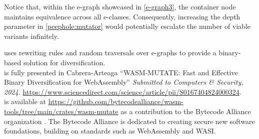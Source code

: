 Notice that, within the e-graph showcased in \autoref{e-graph3}, the container node maintains equivalence across all e-classes. 
Consequently, increasing the depth parameter in \autoref{peephole:mutator} would potentially escalate the number of viable variants infinitely.




\begin{tcolorbox}[title=Contribution paper and artifact,boxrule=1pt,arc=.2em,boxsep=0.5mm]
  \tool uses rewriting rules and random traversals over e-graphs to provide a binary-based solution for \Wasm diversification. \\
  \tool is fully presented in Cabrera-Arteaga \etal ``WASM-MUTATE: Fast and Effective Binary Diversification for WebAssembly''
  \emph{Submitted to Computers \& Security, 2024. }
 \url{https://www.sciencedirect.com/science/article/pii/S0167404824000324}.
  \\
  \tool is available at \url{https://github.com/bytecodealliance/wasm-tools/tree/main/crates/wasm-mutate} as a contribution to the Bytecode Alliance organization . The Bytecode Alliance is dedicated to creating secure new software foundations, building on standards such as WebAssembly and WASI.
\end{tcolorbox}